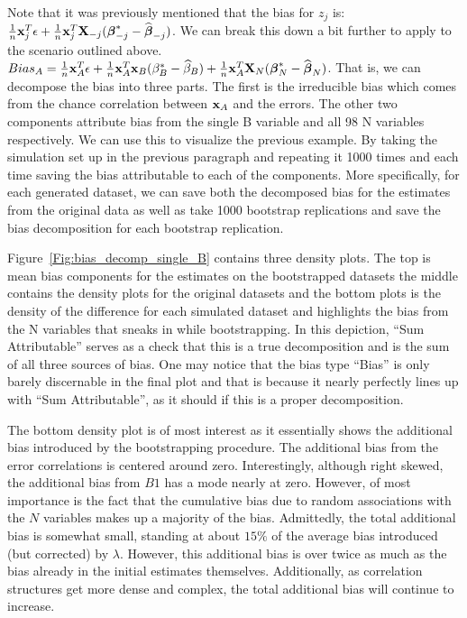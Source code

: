 Note that it was previously mentioned that the bias for $z_j$ is: $\frac{1}{n}\mathbf{x}_j^T \epsilon + \frac{1}{n}\mathbf{x}_j^T \mathbf{X}_{-j}(\boldsymbol{\beta}^*_{-j} - \widehat{\boldsymbol{\beta}}_{-j})$. We can break this down a bit further to apply to the scenario outlined above. $Bias_A = \frac{1}{n}\mathbf{x}_A^T \epsilon + \frac{1}{n}\mathbf{x}_A^T \mathbf{x}_{B}(\beta^*_{B} - \widehat{\beta}_{B}) + \frac{1}{n}\mathbf{x}_A^T \mathbf{X}_{N}(\boldsymbol{\beta}^*_{N} - \widehat{\boldsymbol{\beta}}_{N})$. That is, we can decompose the bias into three parts. The first is the irreducible bias which comes from the chance correlation between $\mathbf{x}_A$ and the errors. The other two components attribute bias from the single B variable and all 98 N variables respectively. We can use this to visualize the previous example. By taking the simulation set up in the previous paragraph and repeating it 1000 times and each time saving the bias attributable to each of the components. More specifically, for each generated dataset, we can save both the decomposed bias for the estimates from the original data as well as take 1000 bootstrap replications and save the bias decomposition for each bootstrap replication. 

Figure~\ref{Fig:bias_decomp_single_B} contains three density plots. The top is mean bias components for the estimates on the bootstrapped datasets the middle contains the density plots for the original datasets and the bottom plots is the density of the difference for each simulated dataset and highlights the bias from the N variables that sneaks in while bootstrapping. In this depiction, ``Sum Attributable'' serves as a check that this is a true decomposition and is the sum of all three sources of bias. One may notice that the bias type ``Bias'' is only barely discernable in the final plot and that is because it nearly perfectly lines up with ``Sum Attributable'', as it should if this is a proper decomposition.

The bottom density plot is of most interest as it essentially shows the additional bias introduced by the bootstrapping procedure. The additional bias from the error correlations is centered around zero. Interestingly, although right skewed, the additional bias from $B1$ has a mode nearly at zero. However, of most importance is the fact that the cumulative bias due to random associations with the $N$ variables makes up a majority of the bias. Admittedly, the total additional bias is somewhat small, standing at about $15\%$ of the average bias introduced (but corrected) by $\lambda$. However, this additional bias is over twice as much as the bias already in the initial estimates themselves. Additionally, as correlation structures get more dense and complex, the total additional bias will continue to increase. 

